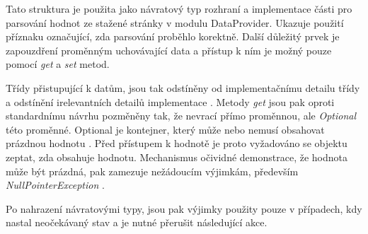 \documentclass[thesis=B,czech]{FITthesis}[2012/06/26]
\begin{document}
Tato struktura je použita jako návratový typ rozhraní a implementace části pro parsování hodnot 
ze stažené stránky v modulu DataProvider. Ukazuje použití příznaku označující, zda parsování proběhlo korektně. Další důležitý prvek
je zapouzdření proměnným uchovávající data a přístup k ním je možný pouze pomocí \textit{get} a \textit{set} metod.
\par
Třídy přistupující k datům, jsou tak odstíněny od implementačnímu detailu třídy a odstínění irelevantních detailů implementace \cite{encapsulation}.
Metody \textit{get} jsou pak oproti standardnímu návrhu pozměněny tak, že nevrací přímo proměnnou, ale \textit{Optional} této proměnné.
Optional je kontejner, který může nebo nemusí obsahovat prázdnou hodnotu \cite{optional}. Před přístupem k hodnotě je proto vyžadováno se objektu zeptat, zda obsahuje hodnotu. Mechanismus očividné demonstrace, že hodnota může být prázdná, pak zamezuje nežádoucím výjimkám, především \textit{NullPointerException} \cite{nullPointerException}.
\par
Po nahrazení návratovými typy, jsou pak výjimky použity pouze v případech, kdy nastal neočekávaný stav a je nutné přerušit následující akce.
\end{document}
